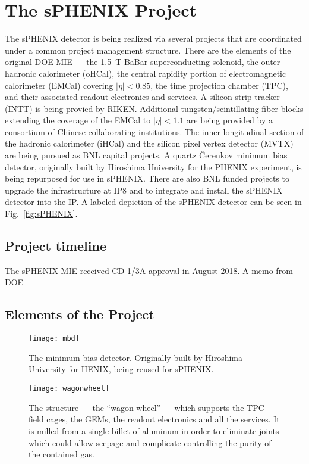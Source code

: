 \chapter{The sPHENIX Project}
\label{chap:project}

The sPHENIX detector is being realized via several projects that are
coordinated under a common project management structure.  There are
the elements of the original DOE MIE --- the 1.5~T BaBar
superconducting solenoid, the outer hadronic calorimeter (oHCal), the
central rapidity portion of electromagnetic calorimeter (EMCal)
covering $|\eta| < 0.85$, the time projection chamber (TPC), and their
associated readout electronics and services.  A silicon strip tracker
(INTT) is being provied by RIKEN.  Additional tungsten/scintillating
fiber blocks extending the coverage of the EMCal to $|\eta| < 1.1$ are
being provided by a consortium of Chinese collaborating institutions.
The inner longitudinal section of the hadronic calorimeter (iHCal) and
the silicon pixel vertex detector (MVTX) are being pursued as BNL
capital projects.  A quartz \v{C}erenkov minimum bias detector,
originally built by Hiroshima University for the PHENIX experiment, is
being repurposed for use in sPHENIX.  There are also BNL funded
projects to upgrade the infrastructure at IP8 and to integrate and
install the sPHENIX detector into the IP.  A labeled depiction of the
sPHENIX detector can be seen in Fig.~\ref{fig:sPHENIX}.

\section{Project timeline}
\label{sec:timeline}

The sPHENIX MIE received CD-1/3A approval in August 2018.  A memo from DOE 

\section{Elements of the Project}
\label{sec:elements}

\begin{figure}[hbt!]
  \centering
  \texttt{[image: mbd]}
  \caption{The minimum bias detector. Originally built by Hiroshima University for HENIX, being reused for sPHENIX. }
  \label{fig:mbd}
\end{figure}

\begin{figure}[hbt!]
  \centering
  \texttt{[image: wagonwheel]}
  \caption{The structure --- the ``wagon wheel'' ---  which supports
    the TPC field cages, the GEMs, the readout electronics and all the
    services.  It is milled from a single billet of aluminum in order to
    eliminate joints which could allow seepage and complicate
    controlling the purity of the contained gas. }
  \label{fig:wagonwheel}
\end{figure}

